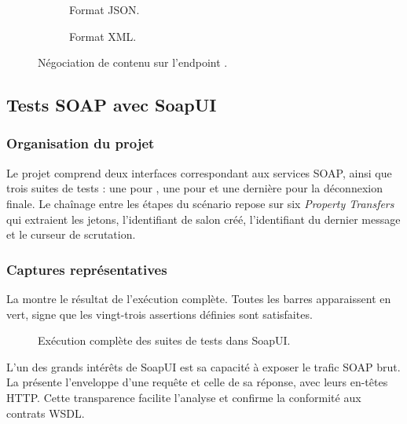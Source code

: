 \begin{figure}[H]
  \centering
  \begin{subfigure}[t]{0.48\linewidth}
    \centering
    \fbox{\rule{0pt}{5cm}\rule{6cm}{0pt}}
    \caption{Format JSON.}
    \label{fig:postman-json}
  \end{subfigure}\hfill
  \begin{subfigure}[t]{0.48\linewidth}
    \centering
    \fbox{\rule{0pt}{5cm}\rule{6cm}{0pt}}
    \caption{Format XML.}
    \label{fig:postman-xml}
  \end{subfigure}
  \caption{Négociation de contenu sur l'endpoint .}
\end{figure}

\subsection{Tests SOAP avec SoapUI}

\subsubsection{Organisation du projet}

Le projet  comprend deux interfaces correspondant aux services SOAP, ainsi que trois suites de tests : une pour , une pour  et une dernière pour la déconnexion finale. Le chaînage entre les étapes du scénario repose sur six \emph{Property Transfers} qui extraient les jetons, l'identifiant de salon créé, l'identifiant du dernier message et le curseur de scrutation.

\subsubsection{Captures représentatives}

La  montre le résultat de l'exécution complète. Toutes les barres apparaissent en vert, signe que les vingt-trois assertions définies sont satisfaites.

\begin{figure}[H]
  \centering
  \fbox{\rule{0pt}{7cm}\rule{12cm}{0pt}}
  \caption{Exécution complète des suites de tests dans SoapUI.}
  \label{fig:soapui-runner}
\end{figure}

L'un des grands intérêts de SoapUI est sa capacité à exposer le trafic SOAP brut. La  présente l'enveloppe d'une requête  et celle de sa réponse, avec leurs en-têtes HTTP. Cette transparence facilite l'analyse et confirme la conformité aux contrats WSDL.

